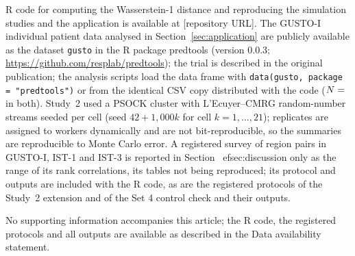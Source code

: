 \documentclass[AMA,Times1COL]{WileyNJDv5}
\begin{document}
R code for computing the Wasserstein-1 distance and reproducing the simulation studies and the application is available at [repository URL]. The GUSTO-I individual patient data analysed in Section~\ref{sec:application} are publicly available as the dataset \texttt{gusto} in the R package predtools (version 0.0.3; \url{https://github.com/resplab/predtools}); the trial is described in the original publication;\cite{gusto1993} the analysis scripts load the data frame with \texttt{data(gusto, package = "predtools")} or from the identical CSV copy distributed with the code ($N = \numval{gustoN}$ in both). Study~2 used a PSOCK cluster with L'Ecuyer--CMRG random-number streams seeded per cell (seed $42 + 1{,}000k$ for cell $k = 1, \ldots, 21$); replicates are assigned to workers dynamically and are not bit-reproducible, so the summaries are reproducible to Monte Carlo error. A registered survey of region pairs in GUSTO-I, IST-1 and IST-3 is reported in Section~
ef{sec:discussion} only as the range of its rank correlations, its tables not being reproduced; its protocol and outputs are included with the R code, as are the registered protocols of the Study~2 extension and of the Set 4 control check and their outputs.




No supporting information accompanies this article; the R code, the registered protocols and all outputs are available as described in the Data availability statement.

\appendix

\end{document}

